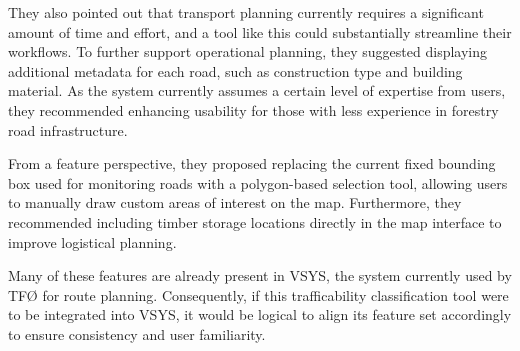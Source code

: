 They also pointed out that transport planning currently requires a significant amount of time and effort, and a tool like this could substantially streamline their workflows. To further support operational planning, they suggested displaying additional metadata for each road, such as construction type and building material. As the system currently assumes a certain level of expertise from users, they recommended enhancing usability for those with less experience in forestry road infrastructure.

From a feature perspective, they proposed replacing the current fixed bounding box used for monitoring roads with a polygon-based selection tool, allowing users to manually draw custom areas of interest on the map. Furthermore, they recommended including timber storage locations directly in the map interface to improve logistical planning.

Many of these features are already present in VSYS, the system currently used by TFØ for route planning. Consequently, if this trafficability classification tool were to be integrated into VSYS, it would be logical to align its feature set accordingly to ensure consistency and user familiarity.

